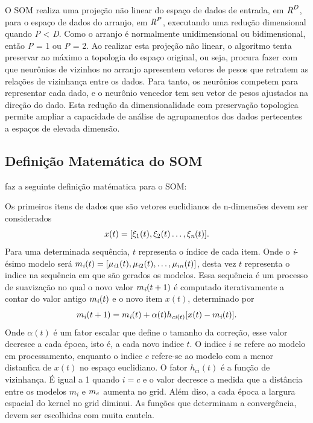\documentclass[
	12pt,				%
	openright,			%
	twoside,			%
	a4paper,			%
	english,			%
	french,				%
	spanish,			%
	brazil				%
	]{abntex2}
\begin{document}
O SOM realiza uma projeção não linear do espaço de dados de entrada, em $\emph{R}^D$, para o espaço de dados do arranjo, em $\emph{R}^P$, executando uma redução dimensional quando \emph{P} < \emph{D}. Como o arranjo é normalmente unidimensional ou bidimensional, então \emph{P} = 1 ou \emph{P} = 2. Ao realizar esta projeção não linear, o algoritmo tenta preservar ao máximo a topologia do espaço original, ou seja, procura fazer com que neurônios de vizinhos no arranjo apresentem vetores de pesos que retratem as relações de vizinhança entre os dados. Para tanto, os neurônios competem para representar cada dado, e o neurônio vencedor tem seu vetor de pesos ajustados na direção do dado. Esta redução da dimensionalidade com preservação topologica permite ampliar a capacidade de análise de agrupamentos dos dados pertecentes a espaços de elevada dimensão.\cite[p.37]{zuchini2003aplicaccoes}

\subsection{Definição Matemática do SOM}

 faz a seguinte definição matématica para o SOM:

Os primeiros itens de dados que são vetores euclidianos de n-dimensões devem ser considerados 
$$x(t) = [\xi_1(t),\xi_2(t)\ldots, \xi_\emph{n}(t)]. $$
Para uma determinada sequência, $t$ representa o índice de cada item. Onde o \emph{i}-ésimo modelo será $m_\emph{i}(t) = [\mu_{\emph{i}1}(t),\mu_{\emph{i}2}(t),\ldots,\mu_{in}(t)]$, desta vez $t$ representa o indice na sequência em que são gerados os modelos. Essa sequência é um processo de suavização no qual o novo valor $m_\emph{i}(t + 1)$ é computado iterativamente a contar do valor antigo $m_\emph{i}(t)$ e o novo item $x(t)$, determinado por $$m_\emph{i}(t + 1) = m_\emph{i}(t) + \alpha(t)h_{\emph{ci}(t)}[x(t) - m_\emph{i}(t)].$$
Onde $\alpha(t)$ é um fator escalar que define o tamanho da correção, esse valor decresce a cada época, isto é, a cada novo indice $t$. O indice $i$ se refere ao modelo em processamento, enquanto o indice $c$ refere-se ao modelo com a menor distanfica de $x(t)$ no espaço euclidiano. O fator $h_{ci}(t)$ é a função de vizinhança. É igual a 1 quando $i = c$ e o valor decresce a medida que a distância entre os modelos $m_i$ e $m_\emph{c}$ aumenta no grid. Além diso, a cada época a largura espacial do kernel no grid diminui. As funções que determinam a convergência, devem ser escolhidas com muita cautela.
\end{document}

